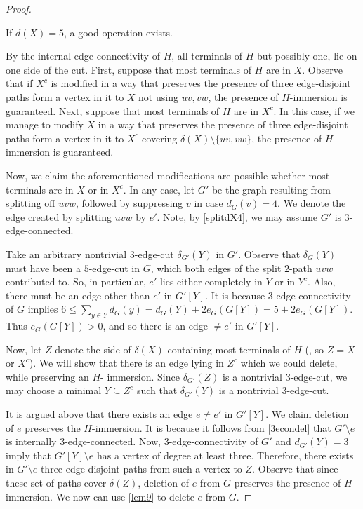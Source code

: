 \documentclass[10pt,a4paper]{amsart}
\begin{document}
\begin{proof}
\begin{claim}
If $d(X)=5$, a good operation exists.
\end{claim}
By the internal edge-connectivity of $H$, all terminals of $H$ but possibly one, lie on one side of the cut. First, suppose that most terminals of $H$ are in $X$. Observe that if $X^c$ is modified in a way that preserves the presence of three edge-disjoint paths form a vertex in it to $X$ not using $uv, vw$, the presence of $H$-immersion is guaranteed. Next, suppose that most terminals of $H$ are in $X^c$. In this case, if we manage to modify $X$ in a way that preserves the presence of three edge-disjoint paths form a vertex in it to $X^c$ covering $\delta(X)\setminus \{uv,vw\}$, the presence of $H$-immersion is guaranteed. 

Now, we claim the aforementioned modifications are possible whether most terminals are in $X$ or in $X^c$. In any case, let $G'$ be the graph resulting from splitting off $uvw$, followed by suppressing $v$ in case $d_{G}(v)=4$. We denote the edge created by splitting $uvw$ by $e'$. Note, by \ref{splitdX4}, we may assume $G'$ is 3-edge-connected.

Take an arbitrary nontrivial $3$-edge-cut $\delta_{G'}(Y)$ in $G'$. Observe that $\delta_G(Y)$ must have been a $5$-edge-cut in $G$, which both edges of the split $2$-path $uvw$ contributed to. So, in particular, $e'$ lies either completely in $Y$ or in $Y^c$. Also, there must be an edge other than $e'$ in $G'[Y]$. It is because $3$-edge-connectivity of $G$ implies $6\le \sum_{y \in Y} d_G(y)=d_G(Y)+2 e_G(G[Y])=5+2 e_G(G[Y])$. Thus $e_G(G[Y])>0$, and so there is an edge $\neq e'$ in $G'[Y]$.

Now, let $Z$ denote the side of $\delta(X)$ containing most terminals of $H$ (, so $Z=X$ or $X^c$). We will show that there is an edge lying in $Z^c$ which we could delete, while preserving an $H$- immersion. Since $\delta_{G'}(Z)$ is a nontrivial $3$-edge-cut, we may choose a minimal $Y\subseteq Z^c$ such that $\delta_{G'}(Y)$ is a nontrivial $3$-edge-cut.

It is argued above that there exists an edge $e\neq e'$ in $G'[Y]$. We claim deletion of $e$ preserves the $H$-immersion. It is because it follows from \cref{3econdel} that $G'\setminus e$ is internally $3$-edge-connected. Now, $3$-edge-connectivity of $G'$ and $d_{G'}(Y)=3$ imply that $G'[Y]\setminus e$ has a vertex of degree at least three. Therefore, there exists in $G'\setminus e$ three edge-disjoint paths from such a vertex to $Z$. Observe that since these set of paths cover $\delta(Z)$, deletion of $e$ from $G$ preserves the presence of $H$-immersion. We now can use \cref{lem9} to delete $e$ from $G$.
\end{proof}
\end{document}
